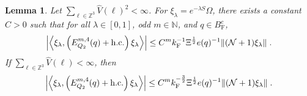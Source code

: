 \documentclass[12pt,a4paper]{article}
\numberwithin{equation}{section}
\newcommand{\NNN}{\mathbb{N}}
\newcommand{\1}{\mathbb{I}}
\newcommand{\F}{\mathrm{F}}
\newcommand{\kF}{k_\F}
\newcommand{\Zstar}{\mathbb{Z}^3} %
\newcommand{\Z}{\mathbb{Z}}
\newcommand{\NN}{\mathcal{N}}
\newcommand{\half}{\frac{1}{2}}
\newcommand{\eva}[1]{\left\langle #1 \right\rangle}
\theoremstyle{plain}
\newtheorem{lemma}[theorem]{Lemma}
\theoremstyle{definition}
\theoremstyle{remark}
\theoremstyle{plain}
\theoremstyle{definition}
\theoremstyle{remark}
\begin{document}
\begin{lemma} \label{lem:EQ217}
Let $ \sum_{\ell \in \Zstar} \hat{V}(\ell)^2 < \infty $. For $\xi_\lambda = e^{-\lambda S} \Omega$, there exists a constant $ C > 0 $ such that for all $ \lambda \in [0,1] $, odd $ m \in \NNN $, and $ q \in B_{\F}^c $,
\begin{align}
	\abs{\eva{\xi_\lambda,\left(E^{m,4}_{Q_2}(q) + \mathrm{h.c.}\right) \xi_\lambda }}
	\leq C^m \kF^{-1} \Xi^{\half}  e(q)^{-1}
		\norm{(\NN+1) \xi_\lambda } \;. \label{eq:estEQ217_Coulomb}
\end{align}
If $ \sum_{\ell \in \Zstar} \hat{V}(\ell) < \infty $, then
\begin{align}
	\abs{\eva{\xi_\lambda,\left(E^{m,4}_{Q_2}(q) + \mathrm{h.c.}\right) \xi_\lambda }}
	\leq C^m \kF^{-\frac 32} \Xi^{\half}  e(q)^{-1}
		\norm{(\NN+1) \xi_\lambda } \;. \label{eq:estEQ217}
\end{align}
\end{lemma}
\end{document}
